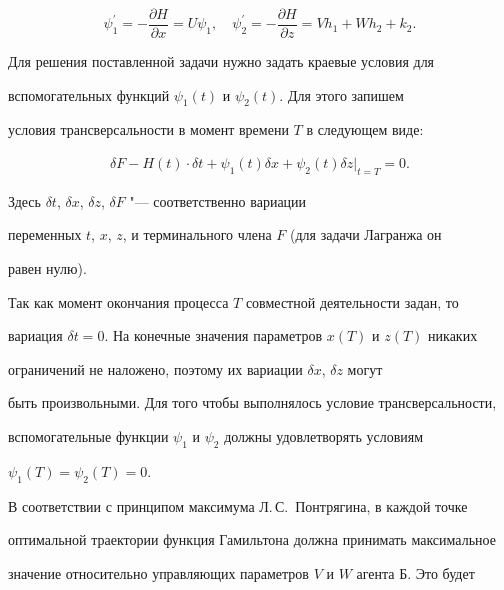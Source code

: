\[

\psi_1^\prime=-\frac{\partial H}{\partial x}=U\psi_1, \quad  \psi_2^\prime=-\frac{\partial H}{\partial z}=Vh_1+Wh_2+k_2.

\]



Для решения поставленной задачи нужно задать краевые условия для

вспомогательных функций $\psi_1(t)$ и $\psi_2(t)$. Для этого запишем

условия трансверсальности в момент времени $T$ в следующем виде:

\begin{equation}

\label{f3}

   \begin{aligned}

	\delta F - H(t)\cdot \delta t + \psi_1(t) \delta x + \psi_2(t)\delta z \Big|_{t=T}=0.

   \end{aligned}

\end{equation}



\noindent Здесь $\delta t$, $\delta x$, $\delta z$, $\delta F$ "---  соответственно вариации

переменных $t$, $x$, $z$, и терминального члена $F$ (для задачи Лагранжа он

равен нулю).



Так как момент окончания процесса $T$ совместной деятельности задан, то

вариация $\delta t=0$. На конечные значения параметров $x(T)$ и $z(T)$ никаких

ограничений не наложено, поэтому их вариации $\delta x$, $ \delta z$ могут

быть произвольными. Для того чтобы выполнялось условие трансверсальности,

вспомогательные функции $\psi_1$ и $\psi_2$ должны удовлетворять условиям

$\psi_1(T)=\psi_2(T)=0$.



В соответствии с принципом максимума Л.\,С.~Понтрягина, в каждой точке

оптимальной траектории функция Гамильтона должна принимать максимальное

значение относительно управляющих параметров $V$ и $W$ агента Б. Это будет

